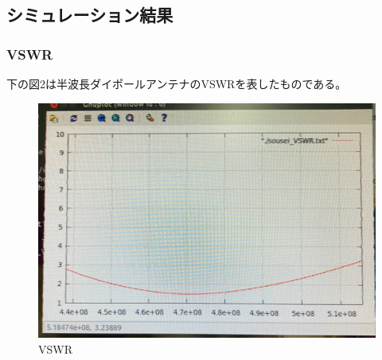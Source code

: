 \documentclass[dvipdfmx,autodetect-engine,titlepage]{jsarticle}
\begin{document}
\subsection{シミュレーション結果}

\subsubsection{VSWR}
下の図2は半波長ダイポールアンテナのVSWRを表したものである。
\begin{figure}[H]
  \centering
  \includegraphics[scale=0.4]{fg2.png}
  \caption{VSWR}\label{fig:図2}
\end{figure}
\end{document}
